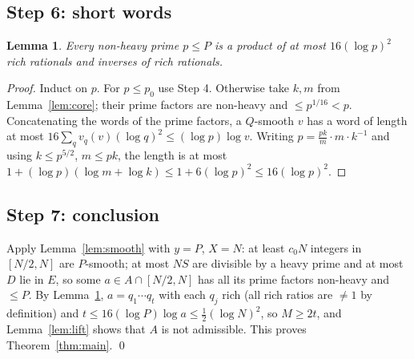 \documentclass[11pt]{amsart}
\newtheorem{lemma}[theorem]{Lemma}
\theoremstyle{definition}
\theoremstyle{remark}
\begin{document}
\subsection{Step 6: short words}
\begin{lemma}\label{lem:words}
Every non-heavy prime $p\le P$ is a product of at most $16(\log p)^2$ rich rationals and inverses of rich rationals.
\end{lemma}
\begin{proof}
Induct on $p$. For $p\le p_0$ use Step 4. Otherwise take $k,m$ from Lemma~\ref{lem:core}; their prime factors are non-heavy and $\le p^{1/16}<p$. Concatenating the words of the prime factors, a $Q$-smooth $v$ has a word of length at most $16\sum_qv_q(v)(\log q)^2\le(\log p)\log v$. Writing $p=\frac{pk}m\cdot m\cdot k^{-1}$ and using $k\le p^{5/2}$, $m\le pk$, the length is at most $1+(\log p)(\log m+\log k)\le1+6(\log p)^2\le16(\log p)^2$.
\end{proof}

\subsection{Step 7: conclusion}
Apply Lemma~\ref{lem:smooth} with $y=P$, $X=N$: at least $c_0N$ integers in $[N/2,N]$ are $P$-smooth; at most $NS$ are divisible by a heavy prime and at most $D$ lie in $E$, so some $a\in A\cap[N/2,N]$ has all its prime factors non-heavy and $\le P$. By Lemma~\ref{lem:words}, $a=q_1\cdots q_t$ with each $q_j$ rich (all rich ratios are $\ne1$ by definition) and $t\le16(\log P)\log a\le\frac12(\log N)^2$, so $M\ge2t$, and Lemma~\ref{lem:lift} shows that $A$ is not admissible. This proves Theorem~\ref{thm:main}. \qed
\end{document}
